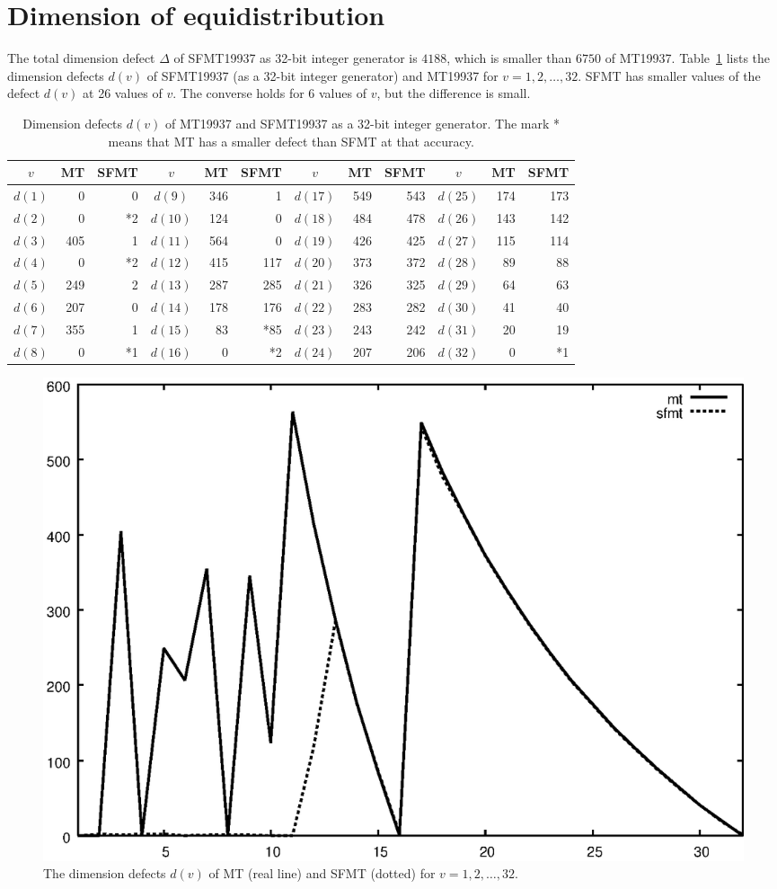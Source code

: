 \documentclass[acmnow]{acmtrans2m}
\begin{document}
\section{Dimension of equidistribution}
The total dimension defect $\Delta$ of SFMT19937
as 32-bit integer generator is $4188$, 
which is smaller than $6750$ of MT19937.
Table~\ref{tab:dd} lists the dimension defects $d(v)$
of SFMT19937 (as a 32-bit integer generator) 
and MT19937 for $v=1,2,\ldots, 32$.
SFMT has smaller values of the defect $d(v)$
at 26 values of $v$. The converse holds for 6 values of
$v$, but the difference is small.
\begin{table}
\begin{tabular}{|c|rr||c|rr||c|rr||c|rr|} \hline
$v$ & MT & SFMT & $v$ & MT & SFMT & $v$ & MT & SFMT & $v$ & MT & SFMT\\ \hline
$d(1)$ & 0 & 0 & $d(9)$ & 346 & 1 & $d(17)$ & 549 & 543 & $d(25)$ & 174 & 173 \\
$d(2)$ & 0 & *2 & $d(10)$ & 124 & 0 & $d(18)$ & 484 & 478 & $d(26)$ & 143 & 142
\\
$d(3)$ & 405 & 1 & $d(11)$ & 564 & 0 & $d(19)$ & 426 & 425 & $d(27)$ & 115 & 114
\\
$d(4)$ & 0 & *2 & $d(12)$ & 415 & 117 & $d(20)$ & 373 & 372 & $d(28)$ & 89 & 88
\\
$d(5)$ & 249 & 2 & $d(13)$ & 287 & 285 & $d(21)$ & 326 & 325 & $d(29)$ & 64 & 63
\\
$d(6)$ & 207 & 0 & $d(14)$ & 178 & 176 & $d(22)$ & 283 & 282 & $d(30)$ & 41 & 40
\\
$d(7)$ & 355 & 1 & $d(15)$ & 83 & *85 & $d(23)$ & 243 & 242 & $d(31)$ & 20 & 19 
\\
$d(8)$ & 0 & *1 & $d(16)$ & 0 & *2 & $d(24)$ & 207 & 206 & $d(32)$ & 0 & *1 \\
\hline

\end{tabular}
\caption{Dimension defects 
$d(v)$ of MT19937 and SFMT19937
as a 32-bit integer generator.
The mark * means that MT has a smaller defect than SFMT
at that accuracy.
}\label{tab:dd}
\end{table}

\begin{figure}
\begin{center}
\includegraphics[width=0.8\linewidth,height=0.7\textheight,
keepaspectratio]{delta.eps}
\end{center}
\caption{The dimension defects $d(v)$ of MT (real line) and SFMT (dotted)
for $v=1,2,\ldots, 32$.}
\end{figure}
\end{document}
